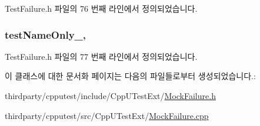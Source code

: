 Test\+Failure.\+h 파일의 76 번째 라인에서 정의되었습니다.

\subsubsection[{\texorpdfstring{test\+Name\+Only\+\_\+}{testNameOnly_}}]{ test\+Name\+Only\+\_\+\hspace{0.3cm}{\ttfamily [protected]}, {\ttfamily [inherited]}}\hypertarget{class_test_failure_a60a0b2466b44483497e83d73b70241f2}{}\label{class_test_failure_a60a0b2466b44483497e83d73b70241f2}


Test\+Failure.\+h 파일의 77 번째 라인에서 정의되었습니다.



이 클래스에 대한 문서화 페이지는 다음의 파일들로부터 생성되었습니다.\+:\begin{DoxyCompactItemize}
\item 
thirdparty/cpputest/include/\+Cpp\+U\+Test\+Ext/\hyperlink{_mock_failure_8h}{Mock\+Failure.\+h}\item 
thirdparty/cpputest/src/\+Cpp\+U\+Test\+Ext/\hyperlink{_mock_failure_8cpp}{Mock\+Failure.\+cpp}\end{DoxyCompactItemize}
